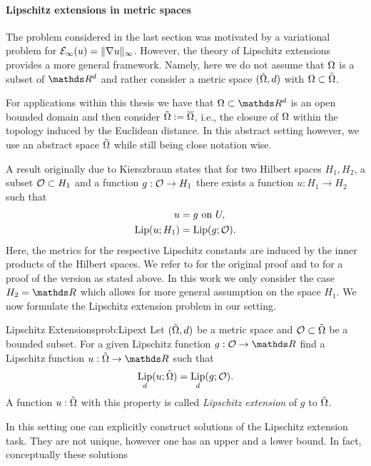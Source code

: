 \paragraph{Lipschitz extensions in metric spaces}
%
The problem considered in the last section was motivated by a variational problem for $\mathcal{E}_\infty(u)=\|\nabla u\|_\infty$. However, the theory of Lipschitz extensions provides a more general framework. Namely, here we do not assume that $\Omega$ is a subset of 
$\R^d$ and rather consider a metric space $(\tilde{\Omega},d)$ with $\Omega\subset \tilde{\Omega}$. 
%
\begin{remark}{}{}
For applications within this thesis we have that $\domain\subset\R^d$ is an open bounded domain and then consider 
$\tilde{\Omega}:= \overline{\Omega}$, i.e., the closure of $\Omega$ within the topology induced by the Euclidean distance. 
In this abstract setting however, we use an abstract space $\tilde{\Omega}$ while still being close notation wise.
\end{remark}
%
%
%
A result originally due to Kierszbraun \cite{Kirszbraun1934} states that for two Hilbert spaces $H_1, H_2$, a subset $\mathcal{O}\subset H_1$ and a function $g:\mathcal{O}\to H_1$ there exists a function $u:H_1\to H_2$ such that 
%
\begin{align*}
u &= g \text{ on } U,\\
\operatorname*{Lip}(u; H_1) &= \operatorname*{Lip}(g; \mathcal{O}).
\end{align*}
%
Here, the metrics for the respective Lipschitz constants are induced by the inner products of the Hilbert spaces. We refer to \cite{Kirszbraun1934} for the original proof and to \cite[Th. 1.31]{Schwartz1969} for a proof of the version as stated above.
In this work we only consider the case $H_2=\R$ which allows for more general assumption on the space $H_1$. We now formulate the Lipschitz extension problem in our setting.
%
\begin{problem}{Lipschitz Extensions}{prob:Lipext}
Let $(\tilde{\Omega},d)$ be a metric space and $\mathcal{O}\subset \tilde{\Omega}$ be a bounded subset. For a given Lipschitz function $g:\conset\to\R$ find a Lipschitz function $u:\tilde\domain\to \R$ such that
%
\begin{align*}
\operatorname*{Lip}_d(u; \tilde{\Omega}) = \operatorname*{Lip}_d(g; \mathcal{O}).
\end{align*}
%
A function $u:\tilde{\Omega}$ with this property is called \emph{Lipschitz extension} of 
$g$ to $\tilde{\Omega}$.
\end{problem}
%
In this setting one can explicitly construct solutions of the Lipschitz extension task. They are not unique, however one has an upper and a lower bound. In fact, conceptually these solutions 
